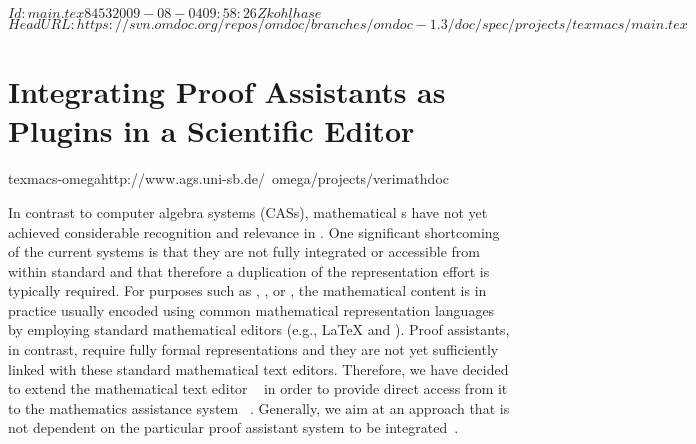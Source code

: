 \svnInfo $Id: main.tex 8453 2009-08-04 09:58:26Z kohlhase $
\svnKeyword $HeadURL: https://svn.omdoc.org/repos/omdoc/branches/omdoc-1.3/doc/spec/projects/texmacs/main.tex $

\section[Proof Assistants in Scientific Editors]{Integrating Proof Assistants as Plugins
  in a Scientific Editor}
\begin{project}{texmacs-omega}{http://www.ags.uni-sb.de/~omega/projects/verimathdoc}
\end{project}


In contrast to computer algebra systems (CASs), mathematical {s} have not yet achieved considerable recognition and relevance in
{}.  One significant shortcoming of the current systems is
that they are not fully integrated or accessible from within standard
{} and that therefore a duplication of the
representation effort is typically required. For purposes such as {},
{}, or {}, the mathematical content is in
practice usually encoded using common mathematical representation languages by employing
standard mathematical editors (e.g., {\LaTeX} and {\emacs}). Proof assistants, in
contrast, require fully formal representations and they are not yet sufficiently linked
with these standard mathematical text editors.  Therefore, we have decided to extend the
mathematical text editor {\texmacs}~\cite{VdH01} in order to provide direct access from it
to the mathematics assistance system {\OMEGA}~\cite{OMEGA02,SBA-05-a}. Generally, we aim
at an approach that is not dependent on the particular proof assistant system to be
integrated~\cite{ABFL-05-a}.

